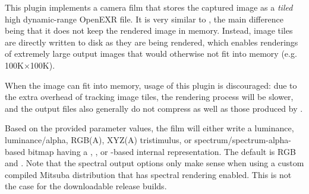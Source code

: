 
This plugin implements a camera film that stores the captured image
as a \emph{tiled} high dynamic-range OpenEXR file. It is very similar to
, the main difference being that it does not keep
the rendered image in memory. Instead, image tiles are directly written
to disk as they are being rendered, which enables renderings of extremely
large output images that would otherwise not fit into memory (e.g.
100K$\times$100K).

When the image can fit into memory, usage of this plugin is discouraged:
due to the extra overhead of tracking image tiles, the rendering process
will be slower, and the output files also generally do not compress as
well as those produced by .

Based on the provided parameter values, the film will either write a luminance,
luminance/alpha, RGB(A), XYZ(A) tristimulus, or spectrum/spectrum-alpha-based
bitmap having a , , or -based
internal representation. The default is RGB and .
Note that the spectral output options only make sense when using a
custom compiled Mitsuba distribution that has spectral rendering
enabled. This is not the case for the downloadable release builds.

